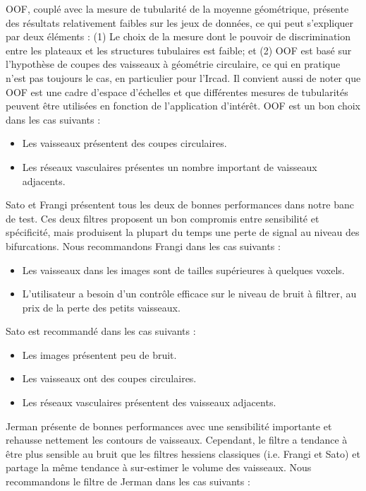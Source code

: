 OOF, couplé avec la mesure de tubularité de la moyenne géométrique, présente des résultats relativement faibles sur les jeux de données, ce qui peut s'expliquer par deux éléments : (1) Le choix de la mesure dont le pouvoir de discrimination entre les plateaux et les structures tubulaires est faible; et (2) OOF est basé sur l'hypothèse de coupes des vaisseaux à géométrie circulaire, ce qui en pratique n'est pas toujours le cas, en particulier pour l'Ircad. Il convient aussi de noter que OOF est une cadre d'espace d'échelles et que différentes mesures de tubularités peuvent être utilisées en fonction de l'application d'intérêt. OOF est un bon choix dans les cas suivants : 

\begin{itemize}
  \item Les vaisseaux présentent des coupes circulaires.
  \item Les réseaux vasculaires présentes un nombre important de vaisseaux adjacents.
\end{itemize}

Sato et Frangi présentent tous les deux de bonnes performances dans notre banc de test. Ces deux filtres proposent un bon compromis entre sensibilité et spécificité, mais produisent la plupart du temps une perte de signal au niveau des bifurcations. Nous recommandons Frangi dans les cas suivants :

\begin{itemize}
  \item Les vaisseaux dans les images sont de tailles supérieures à quelques voxels.
  \item L'utilisateur a besoin d'un contrôle efficace sur le niveau de bruit à filtrer, au prix de la perte des petits vaisseaux.
\end{itemize}

Sato est recommandé dans les cas suivants :

\begin{itemize}
  \item Les images présentent peu de bruit.
  \item Les vaisseaux ont des coupes circulaires.
  \item Les réseaux vasculaires présentent des vaisseaux adjacents.
\end{itemize}

Jerman présente de bonnes performances avec une sensibilité importante et rehausse nettement les contours de vaisseaux. Cependant, le filtre a tendance à être plus sensible au bruit que les filtres hessiens classiques (i.e. Frangi et Sato) et partage la même tendance à sur-estimer le volume des vaisseaux. Nous recommandons le filtre de Jerman dans les cas suivants : 

